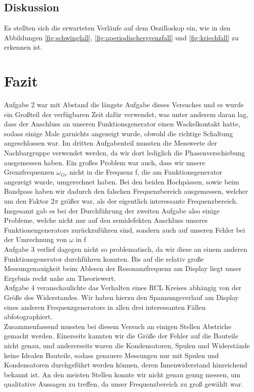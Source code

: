 \documentclass[12pt]{scrartcl}
\begin{document}
\subsection{Diskussion}
Es stellten sich die erwarteten Verläufe auf dem Oszilloskop ein, wie in den Abbildungen \ref{fig:schwingfall}, \ref{fig:aperiodischergrenzfall} und \ref{fig:kriechfall} zu erkennen ist.

\section{Fazit}
Aufgabe 2 war mit Abstand die längste Aufgabe dieses Versuches und es wurde ein Großteil der verfügbaren Zeit dafür verwendet, was unter anderem daran lag, dass der Anschluss an unseren Funktionsgenerator einen Wackelkontakt hatte, sodass einige Male garnichts angezeigt wurde, obwohl die richtige Schaltung angeschlossen war. Im dritten Aufgabenteil mussten die Messwerte der Nachbargruppe verwendet werden, da wir dort lediglich die Phasenverschiebung ausgemessen haben. Ein großes Problem war auch, dass wir unsere Grenzfrequenzen $\omega_{Gr}$ nicht in die Frequenz f, die am Funktionsgenerator angezeigt wurde, umgerechnet haben. Bei den beiden Hochpässen, sowie beim Bandpass haben wir dadurch den falschen Frequenzbereich ausgemessen, welcher um den Faktor 2$\pi$ größer war, als der eigentlich interessante Frequenzbereich. Insgesamt gab es bei der Durchführung der zweiten Aufgabe also einige Probleme, welche nicht nur auf den semidefekten Anschluss unseres Funktionengenerators zurückzuführen sind, sondern auch auf unseren Fehler bei der Umrechnung von $\omega$ in f\\
Aufgabe 3 verlief dagegen nicht so problematisch, da wir diese an einem anderen Funktionsgenerator durchführen konnten. Bis auf die relativ große Messungenauigkeit beim Ablesen der Resonanzfrequenz am Display liegt unser Ergebnis recht nahe am Theoriewert.\\
Aufgabe 4 veranschaulichte das Verhalten eines RCL Kreises abhängig von der Größe des Widerstandes. Wir haben hierzu den Spannungsverlauf am Display eines anderen Frequenzgenerators in allen drei interessanten Fällen abfotographiert.\\
Zusammenfassend mussten bei diesem Versuch an einigen Stellen Abstriche gemacht werden. Einerseits kannten wir die Größe der Fehler auf die Bauteile nicht genau, und andererseits waren die Kondensatoren, Spulen und Widerstände keine Idealen Bauteile, sodass genauere Messungen nur mit Spulen und Kondensatoren durchgeführt werden können, deren Innenwiderstand hinreichend bekannt ist. An den meisten Stellen konnte wir nicht genau genug messen, um qualitative Aussagen zu treffen, da unser Frequenzbereich zu groß gewählt war.
\end{document}
